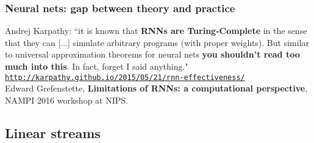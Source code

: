 \documentclass{beamer}
\newcommand{\msmagenta}[1]{{\color{mymagenta} #1}}
\begin{document}
\begin{frame}


\frametitle{\msmagenta{Neural nets: gap between theory and practice}}

Andrej Karpathy: ``it is known that {\bf RNNs are Turing-Complete} in the sense that they can [...] simulate arbitrary programs (with proper weights). But similar to universal approximation theorems for neural nets {\bf you shouldn't read too much into this}. In fact, forget I said anything." \href{http://karpathy.github.io/2015/05/21/rnn-effectiveness/}{\tt\footnotesize http://karpathy.github.io/2015/05/21/rnn-effectiveness/}\\[4ex]


Edward Grefenstette, {\bf Limitations of RNNs: a computational perspective}, NAMPI 2016 workshop at NIPS.

\end {frame}






\subsection{Linear streams}
\end{document}
